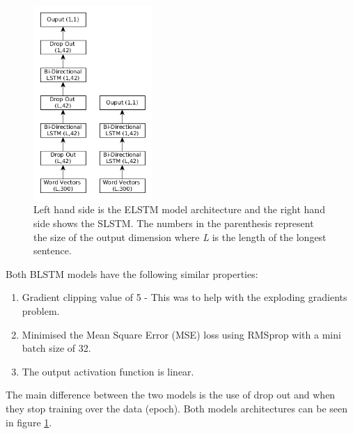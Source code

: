 \documentclass[11pt,a4paper]{article}
\begin{document}
\begin{figure}[t!]
\centering
    \includegraphics[width=0.4\textwidth]{LSTM.png}
\caption{Left hand side is the ELSTM model architecture and the right hand side shows the SLSTM. The numbers in the parenthesis represent the size of the output dimension where \textit{L} is the length of the longest sentence.}
\label{fig:model_archs}
\end{figure}

Both BLSTM models have the following similar properties:
\begin{enumerate}
\item Gradient clipping value of 5 - This was to help with the exploding gradients problem. 
\item Minimised the Mean Square Error (MSE) loss using RMSprop with a mini batch size of 32.
\item The output activation function is linear.
\end{enumerate}
The main difference between the two models is the use of drop out and when they stop training over the data (epoch). Both models architectures can be seen in figure \ref{fig:model_archs}.
\end{document}
